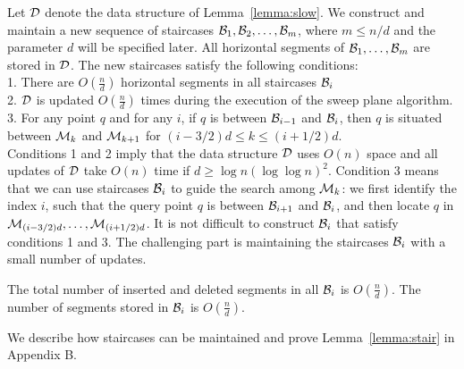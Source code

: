 \documentclass[10pt]{llncs}
\newcommand{\cD}{{\cal D}}
\newcommand{\cM}{{\cal M}}
\newcommand{\cB}{{\cal B}}
\begin{document}
Let $\cD$ denote the data structure of Lemma~\ref{lemma:slow}. We 
construct and maintain a new sequence of staircases
 $\cB_1,\cB_2,\ldots, \cB_m$, where  $m\leq n/d$ and the parameter $d$ will be
 specified later. All horizontal segments of $\cB_1,\ldots,\cB_m$ are stored 
in $\cD$. The new staircases satisfy the following conditions: \\
1. There are $O(\frac{n}{d})$ horizontal segments in all staircases $\cB_i$\\
2. $\cD$ is updated $O(\frac{n}{d})$ times during the execution of the 
sweep plane algorithm.\\
3. For any point $q$ and for any $i$, if $q$ is between $\cB_{i-1}$ and 
$\cB_{i}$, then $q$ is situated between $\cM_k$ and $\cM_{k+1}$ 
for $(i-3/2)d \leq k \leq (i+1/2)d$. \\
Conditions 1 and 2 imply that the data structure $\cD$ uses $O(n)$ space 
and all updates of $\cD$ take $O(n)$ time if $d\geq \log n(\log\log n)^2$. 
Condition 3 means that we can 
use staircases $\cB_i$ to guide the search among $\cM_k$: we first identify 
the index $i$, such that the query point $q$ is between $\cB_{i+1}$ and 
$\cB_i$, and then locate $q$ in  $\cM_{(i-3/2)d},\ldots, \cM_{(i+1/2)d}$. 
It is not difficult to construct $\cB_i$ that satisfy conditions 1 and 3. 
The challenging part is maintaining the staircases $\cB_i$ with a small number 
of updates.  
\begin{lemma}\label{lemma:stair}
The total number of inserted and deleted segments in all $\cB_i$ is 
$O(\frac{n}{d})$. The number of segments stored in $\cB_i$ is 
$O(\frac{n}{d})$.
\end{lemma}
We describe how staircases can be  maintained and prove Lemma~\ref{lemma:stair} in Appendix B.
\end{document}
